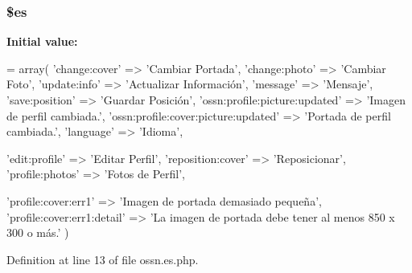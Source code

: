 \subsubsection[{\texorpdfstring{\$es}{$es}}]{\setlength{\rightskip}{0pt plus 5cm}\$es}\hypertarget{components_2_ossn_profile_2locale_2ossn_8es_8php_a388cbda27103d2baee3997798d1f2744}{}\label{components_2_ossn_profile_2locale_2ossn_8es_8php_a388cbda27103d2baee3997798d1f2744}
{\bfseries Initial value\+:}
\begin{DoxyCode}
= array(
        \textcolor{stringliteral}{'change:cover'} => \textcolor{stringliteral}{'Cambiar Portada'},
        \textcolor{stringliteral}{'change:photo'} => \textcolor{stringliteral}{'Cambiar Foto'},
        \textcolor{stringliteral}{'update:info'} => \textcolor{stringliteral}{'Actualizar Información'},
        \textcolor{stringliteral}{'message'} => \textcolor{stringliteral}{'Mensaje'},
        \textcolor{stringliteral}{'save:position'} => \textcolor{stringliteral}{'Guardar Posición'},
        \textcolor{stringliteral}{'ossn:profile:picture:updated'} => \textcolor{stringliteral}{'Imagen de perfil cambiada.'},
        \textcolor{stringliteral}{'ossn:profile:cover:picture:updated'} => \textcolor{stringliteral}{'Portada de perfil cambiada.'},
        \textcolor{stringliteral}{'language'} => \textcolor{stringliteral}{'Idioma'},
        
        \textcolor{stringliteral}{'edit:profile'} => \textcolor{stringliteral}{'Editar Perfil'},
        \textcolor{stringliteral}{'reposition:cover'} => \textcolor{stringliteral}{'Reposicionar'},
        \textcolor{stringliteral}{'profile:photos'} => \textcolor{stringliteral}{'Fotos de Perfil'},
        
        \textcolor{stringliteral}{'profile:cover:err1'} => \textcolor{stringliteral}{'Imagen de portada demasiado pequeña'},
        \textcolor{stringliteral}{'profile:cover:err1:detail'} => \textcolor{stringliteral}{'La imagen de portada debe tener al menos 850 x 300 o más.'}
)
\end{DoxyCode}


Definition at line 13 of file ossn.\+es.\+php.

